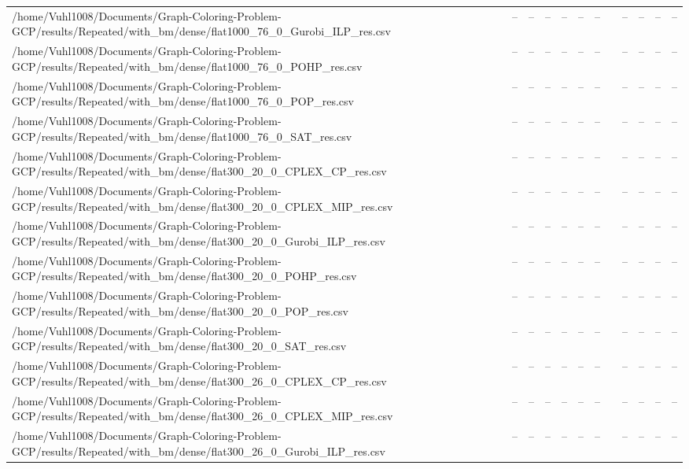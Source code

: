 \begin{table}[htbp]
\begin{tabular}{llllllllllll}
/home/Vuhl1008/Documents/Graph-Coloring-Problem-GCP/results/Repeated/with\_bm/dense/flat1000\_76\_0\_Gurobi\_ILP\_res.csv & -- & -- & -- & -- & -- & -- & {} & -- & -- & -- & -- \\
/home/Vuhl1008/Documents/Graph-Coloring-Problem-GCP/results/Repeated/with\_bm/dense/flat1000\_76\_0\_POHP\_res.csv & -- & -- & -- & -- & -- & -- & {} & -- & -- & -- & -- \\
/home/Vuhl1008/Documents/Graph-Coloring-Problem-GCP/results/Repeated/with\_bm/dense/flat1000\_76\_0\_POP\_res.csv & -- & -- & -- & -- & -- & -- & {} & -- & -- & -- & -- \\
/home/Vuhl1008/Documents/Graph-Coloring-Problem-GCP/results/Repeated/with\_bm/dense/flat1000\_76\_0\_SAT\_res.csv & -- & -- & -- & -- & -- & -- & {} & -- & -- & -- & -- \\
/home/Vuhl1008/Documents/Graph-Coloring-Problem-GCP/results/Repeated/with\_bm/dense/flat300\_20\_0\_CPLEX\_CP\_res.csv & -- & -- & -- & -- & -- & -- & {} & -- & -- & -- & -- \\
/home/Vuhl1008/Documents/Graph-Coloring-Problem-GCP/results/Repeated/with\_bm/dense/flat300\_20\_0\_CPLEX\_MIP\_res.csv & -- & -- & -- & -- & -- & -- & {} & -- & -- & -- & -- \\
/home/Vuhl1008/Documents/Graph-Coloring-Problem-GCP/results/Repeated/with\_bm/dense/flat300\_20\_0\_Gurobi\_ILP\_res.csv & -- & -- & -- & -- & -- & -- & {} & -- & -- & -- & -- \\
/home/Vuhl1008/Documents/Graph-Coloring-Problem-GCP/results/Repeated/with\_bm/dense/flat300\_20\_0\_POHP\_res.csv & -- & -- & -- & -- & -- & -- & {} & -- & -- & -- & -- \\
/home/Vuhl1008/Documents/Graph-Coloring-Problem-GCP/results/Repeated/with\_bm/dense/flat300\_20\_0\_POP\_res.csv & -- & -- & -- & -- & -- & -- & {} & -- & -- & -- & -- \\
/home/Vuhl1008/Documents/Graph-Coloring-Problem-GCP/results/Repeated/with\_bm/dense/flat300\_20\_0\_SAT\_res.csv & -- & -- & -- & -- & -- & -- & {} & -- & -- & -- & -- \\
/home/Vuhl1008/Documents/Graph-Coloring-Problem-GCP/results/Repeated/with\_bm/dense/flat300\_26\_0\_CPLEX\_CP\_res.csv & -- & -- & -- & -- & -- & -- & {} & -- & -- & -- & -- \\
/home/Vuhl1008/Documents/Graph-Coloring-Problem-GCP/results/Repeated/with\_bm/dense/flat300\_26\_0\_CPLEX\_MIP\_res.csv & -- & -- & -- & -- & -- & -- & {} & -- & -- & -- & -- \\
/home/Vuhl1008/Documents/Graph-Coloring-Problem-GCP/results/Repeated/with\_bm/dense/flat300\_26\_0\_Gurobi\_ILP\_res.csv & -- & -- & -- & -- & -- & -- & {} & -- & -- & -- & -- \\

\end{tabular}
\end{table}
